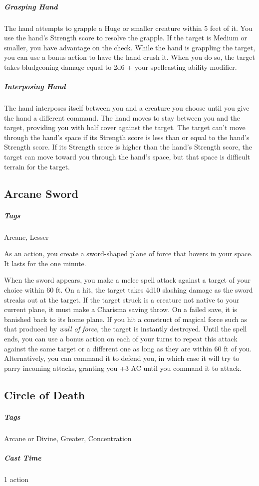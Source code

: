 \subparagraph*{Grasping Hand} The hand attempts to grapple a Huge or smaller creature within 5 feet of it. You use the hand's Strength score to resolve the grapple. If the target is Medium or smaller, you have advantage on the check. While the hand is grappling the target, you can use a bonus action to have the hand crush it. When you do so, the target takes bludgeoning damage equal to 2d6 + your spellcasting ability modifier.

\subparagraph*{Interposing Hand} The hand interposes itself between you and a creature you choose until you give the hand a different command. The hand moves to stay between you and the target, providing you with half cover against the target. The target can't move through the hand's space if its Strength score is less than or equal to the hand's Strength score. If its Strength score is higher than the hand's Strength score, the target can move toward you through the hand's space, but that space is difficult terrain for the target.

\subsection{Arcane Sword}\label{spell:arcane-sword}

\subparagraph*{Tags} Arcane, Lesser

As an action, you create a sword-shaped plane of force that hovers in your space. It lasts for the one minute.

When the sword appears, you make a melee spell attack against a target of your choice within 60 ft. On a hit, the target takes 4d10 slashing damage as the sword streaks out at the target. If the target struck is a creature not native to your current plane, it must make a Charisma saving throw. On a failed save, it is banished back to its home plane. If you hit a construct of magical force such as that produced by \textit{wall of force}, the target is instantly destroyed. Until the spell ends, you can use a bonus action on each of your turns to repeat this attack against the same target or a different one as long as they are within 60 ft of you. Alternatively, you can command it to defend you, in which case it will try to parry incoming attacks, granting you +3 AC until you command it to attack.

\subsection{Circle of Death}\label{spell:circle-of-death}
\subparagraph*{Tags} Arcane or Divine, Greater, Concentration
\subparagraph*{Cast Time} 1 action

